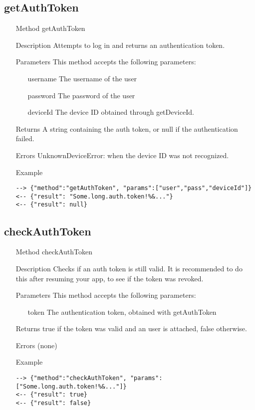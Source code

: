 \documentclass[a4paper]{scrreprt}
\begin{document}
\subsection{getAuthToken}\label{m:getAuthToken}
\begin{enumerate}
\item[Method] getAuthToken
\item[Description] Attempts to log in and returns an authentication token. 
\item[Parameters] This method accepts the following parameters:
	\begin{enumerate}
		\item[username] The username of the user 
    	\item[password] The password of the user 
    	\item[deviceId] The device ID obtained through getDeviceId.
     \end{enumerate}
\item[Returns] A string containing the auth token, or null if the authentication failed.
\item[Errors] UnknownDeviceError: when the device ID was not recognized.
\item[Example]
\begin{lstlisting}
--> {"method":"getAuthToken", "params":["user","pass","deviceId"]}
<-- {"result": "Some.long.auth.token!%&..."}
<-- {"result": null}
\end{lstlisting}
\end{enumerate}

\subsection{checkAuthToken}
\begin{enumerate}
\item[Method] checkAuthToken
\item[Description] Checks if an auth token is still valid. It is recommended to do this after resuming your app, to see if the token was revoked. 
\item[Parameters] This method accepts the following parameters:
	\begin{enumerate}
		\item[token] The authentication token, obtained with getAuthToken
    \end{enumerate}
\item[Returns] true if the token was valid and an user is attached, false otherwise.
\item[Errors] (none)
\item[Example]
\begin{lstlisting}
--> {"method":"checkAuthToken", "params":["Some.long.auth.token!%&..."]}
<-- {"result": true}
<-- {"result": false}
\end{lstlisting}
\end{enumerate}
\end{document}
